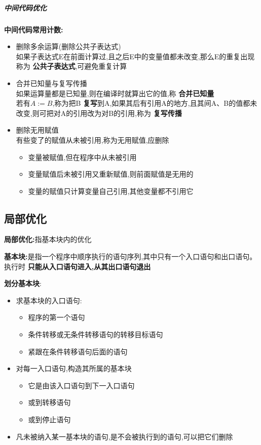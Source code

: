 \documentclass[UTF8,a4paper]{ctexart}
\begin{document}
\subparagraph{中间代码优化}
\textbf{中间代码常用计数:}
\begin{itemize}
 \item 删除多余运算(删除公共子表达式)\\
       如果子表达式E在前面计算过,且之后E中的变量值都未改变,那么E的重复出现称为 \textbf{公共子表达式},可避免重复计算
 \item 合并已知量与复写传播\\
       如果运算量都是已知量,则在编译时就算出它的值,称 \textbf{合并已知量}\\
       若有$A:= B$,称为把B \textbf{复写}到A,如果其后有引用A的地方,且其间A、B的值都未改变,则可把对A的引用改为对B的引用,称为 \textbf{复写传播}
 \item 删除无用赋值\\
       有些变了的赋值从未被引用,称为无用赋值,应删除
       \begin{itemize}
        \item 变量被赋值,但在程序中从未被引用
        \item 变量赋值后未被引用又重新赋值,则前面赋值是无用的
        \item 变量的赋值只计算变量自己引用,其他变量都不引用它
       \end{itemize}
\end{itemize}

\subsection{局部优化}
\textbf{局部优化:}指基本块内的优化

\textbf{基本块:}是指一个程序中顺序执行的语句序列,其中只有一个入口语句和出口语句。执行时 \textbf{只能从入口语句进入,从其出口语句退出}

\textbf{划分基本块}:
\begin{itemize}
 \item 求基本块的入口语句:
       \begin{itemize}
        \item 程序的第一个语句
        \item 条件转移或无条件转移语句的转移目标语句
        \item 紧跟在条件转移语句后面的语句
       \end{itemize}
 \item 对每一入口语句,构造其所属的基本块
       \begin{itemize}
        \item 它是由该入口语句到下一入口语句
        \item 或到转移语句
        \item 或到停止语句
       \end{itemize}
 \item 凡未被纳入某一基本块的语句,是不会被执行到的语句,可以把它们删除
\end{itemize}
\end{document}
